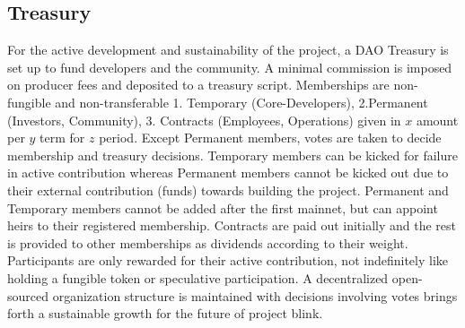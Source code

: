 \documentclass[../Bitcoin Blink.tex]{subfiles}
\begin{document}
\subsection{Treasury}
For the active development and sustainability of the project, a DAO Treasury is set up to fund developers and the community. A minimal commission is imposed on producer fees and deposited to a treasury script. Memberships are non-fungible and non-transferable 1. Temporary (Core-Developers), 2.Permanent (Investors, Community), 3. Contracts (Employees, Operations) given in $x$ amount per $y$ term for $z$ period. Except Permanent members, votes are taken to decide membership and treasury decisions. Temporary members can be kicked for failure in active contribution whereas Permanent members cannot be kicked out due to their external contribution (funds) towards building the project. Permanent and Temporary members cannot be added after the first mainnet, but can appoint heirs to their registered membership. Contracts are paid out initially and the rest is provided to other memberships as dividends according to their weight. Participants are only rewarded for their active contribution, not indefinitely like holding a fungible token or speculative participation. A decentralized open-sourced organization structure is maintained with decisions involving votes brings forth a sustainable growth for the future of project blink.
\end{document}

